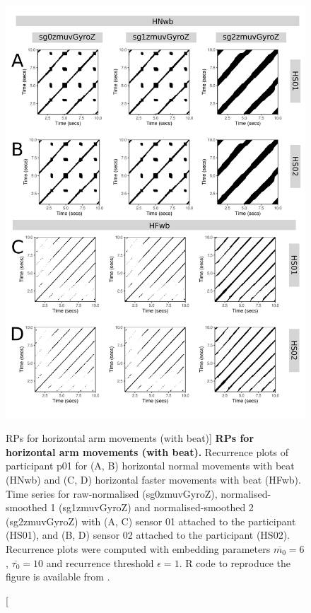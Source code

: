 \begin{figure}
\centering
\includegraphics[height=0.8\textheight]{fig_5_10}
\caption
	[RPs for horizontal arm movements (with beat)]{
	{\bf RPs for horizontal arm movements (with beat).}	
	Recurrence plots of participant p01 for 
	(A, B) horizontal normal movements with beat (HNwb) and
	(C, D) horizontal faster movements with beat (HFwb).
	Time series for raw-normalised (sg0zmuvGyroZ), 
	normalised-smoothed 1 (sg1zmuvGyroZ) and 
	normalised-smoothed 2 (sg2zmuvGyroZ) with
	(A, C) sensor 01 attached to the participant (HS01), and
	(B, D) sensor 02 attached to the participant (HS02).
	Recurrence plots were computed with 
	embedding parameters $\overline{m_0}=6$, $\overline{\tau_0}=10$ and 
	recurrence threshold $\epsilon=1$.
	R code to reproduce the figure is available from \cite{xochicale2018}.
        }
    \label{fig:rps_Hwb_w500}
\end{figure}
